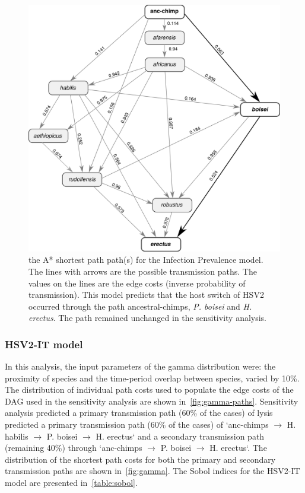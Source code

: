 \documentclass[fleqn,10pt]{wlscirep}
\begin{document}
\begin{figure}[!htbp]
	\centering
	\includegraphics[width=\textwidth]{figs/dag-ip}
	\caption{the A* shortest path path(s) for the Infection Prevalence model. The lines with arrows are the possible transmission paths. The values on the lines are the edge costs (inverse probability of transmission). This model predicts that the host switch of HSV2 occurred through the path ancestral-chimps, \textit{P. boisei} and \textit{H. erectus}. The path remained unchanged in the sensitivity analysis.}
	\label{fig:dag-ip}   
\end{figure}

\subsubsection*{HSV2-IT model}
In this analysis, the input parameters of the gamma distribution were: the proximity of species and the time-period overlap between species, varied by 10\%. The distribution of individual path costs used to populate the edge costs of the DAG used in the sensitivity analysis are shown in~\cref{fig:gamma-paths}. Sensitivity analysis predicted a primary transmission path (60\% of the cases) of lysis predicted a primary transmission path (60\% of the cases) of `anc-chimps $\rightarrow$ H. habilis $\rightarrow$ P. boisei $\rightarrow$ H. erectus` and a secondary transmission path (remaining 40\%) through  `anc-chimps $\rightarrow$ P. boisei $\rightarrow$ H. erectus`. The distribution of the shortest path costs for both the primary and secondary transmission paths are shown in~\cref{fig:gamma}. The Sobol indices for the HSV2-IT model are presented in~\cref{table:sobol}. 
\end{document}
